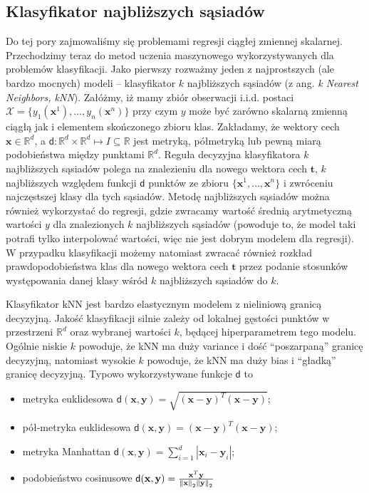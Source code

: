 \documentclass{myclass}
\numberwithin{equation}{section}
\begin{document}
\subsection{Klasyfikator najbliższych sąsiadów}

Do tej pory zajmowaliśmy się problemami regresji ciągłej zmiennej skalarnej. Przechodzimy teraz do
metod uczenia maszynowego wykorzystywanych dla problemów klasyfikacji. Jako pierwszy rozważmy jeden
z najprostszych (ale bardzo mocnych) modeli -- klasyfikator \(k\) najbliższych sąsiadów (z ang.
\textit{k Nearest Neighbors, kNN}). Załóżmy, iż mamy zbiór obserwacji i.i.d. postaci \(\mathcal{X} =
\{y_1(\mathbf{x}^1), \ldots, y_n(\mathbf{x}^n)\}\) przy czym \(y\) może być zarówno skalarną zmienną
ciągłą jak i elementem skończonego zbioru klas. Zakładamy, że wektory cech \(\mathbf{x} \in
\mathbb{R}^d\), a \(\mathsf{d}: \mathbb{R}^d \times \mathbb{R}^d \mapsto I \subseteq \mathbb{R}\)
jest metryką, półmetryką lub pewną miarą podobieństwa między punktami \(\mathbb{R}^d\). Reguła
decyzyjna klasyfikatora \(k\) najbliższych sąsiadów polega na znalezieniu dla nowego wektora cech
\(\mathbf{t}\), \(k\) najbliższych względem funkcji \(\mathsf{d}\) punktów ze zbioru
\(\{\mathbf{x}^1,\ldots,\mathbf{x}^n\}\) i zwróceniu najczęstszej klasy dla tych sąsiadów. Metodę
najbliższych sąsiadów można również wykorzystać do regresji, gdzie zwracamy wartość średnią
arytmetyczną wartości \(y\) dla znalezionych \(k\) najbliższych sąsiadów (powoduje to, że model taki
potrafi tylko interpolować wartości, więc nie jest dobrym modelem dla regresji). W przypadku
klasyfikacji możemy natomiast zwracać również rozkład prawdopodobieństwa klas dla nowego wektora
cech \(\mathbf{t}\) przez podanie stosunków występowania danej klasy wśród \(k\) najbliższych
sąsiadów do \(k\).

Klasyfikator kNN jest bardzo elastycznym modelem z nieliniową granicą decyzyjną. Jakość klasyfikacji
silnie zależy od lokalnej gęstości punktów w przestrzeni \(\mathbb{R}^d\) oraz wybranej wartości
\(k\), będącej hiperparametrem tego modelu. Ogólnie niskie \(k\) powoduje, że kNN ma duży variance i
dość \enquote{poszarpaną} granicę decyzyjną, natomiast wysokie \(k\) powoduje, że kNN ma duży bias i
\enquote{gładką} granicę decyzyjną. Typowo wykorzystywane funkcje \(\mathsf{d}\) to
\begin{itemize}

    \item metryka euklidesowa \(\mathsf{d}(\mathbf{x},\mathbf{y}) = \sqrt{(\mathbf{x} -
    \mathbf{y})^T(\mathbf{x} - \mathbf{y})}\);

    \item pół-metryka euklidesowa \(\mathsf{d}(\mathbf{x},\mathbf{y}) = (\mathbf{x} -
    \mathbf{y})^T(\mathbf{x} - \mathbf{y})\);

    \item metryka Manhattan \(\mathsf{d}(\mathbf{x}, \mathbf{y}) = \sum_{i=1}^d |\mathbf{x}_i -
    \mathbf{y}_i|\);
    
    \item podobieństwo cosinusowe \(\mathsf{d}(\mathbf{x}, \mathbf{y}) =
    \frac{\mathbf{x}^T\mathbf{y}}{\norm{\mathbf{x}}_2 \norm{\mathbf{y}}_2}\)
    
\end{itemize}
\end{document}
